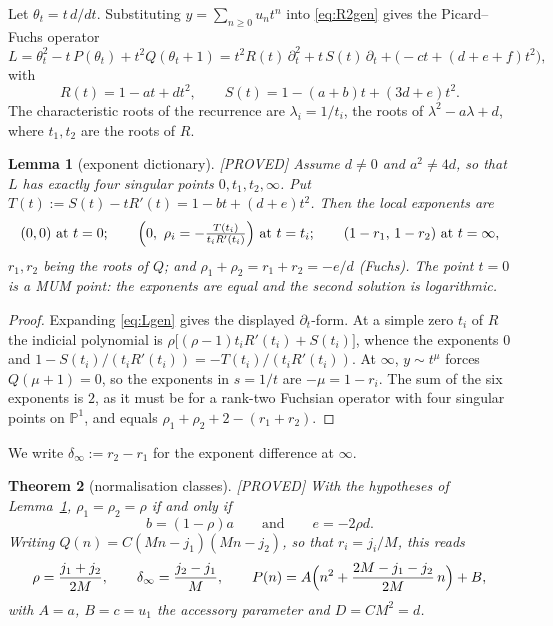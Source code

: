 \documentclass[11pt,reqno]{amsart}
\theoremstyle{plain}
\newtheorem{theorem}{Theorem}[section]
\newtheorem{lemma}[theorem]{Lemma}
\theoremstyle{definition}
\theoremstyle{remark}
\theoremstyle{plain}
\newcommand{\PP}{\mathbb{P}}
\newcommand{\tht}{\theta_t}
\newcommand{\Proved}{\textup{\textsf{[PROVED]}}}
\begin{document}
Let $\tht=t\,d/dt$. Substituting $y=\sum_{n\ge0}u_nt^n$ into \eqref{eq:R2gen}
gives the Picard--Fuchs operator
\begin{equation}\label{eq:Lgen}
L=\tht^2-t\,P(\tht)+t^2Q(\tht+1)
 =t^2R(t)\,\partial_t^2+t\,S(t)\,\partial_t+\bigl(-ct+(d{+}e{+}f)t^2\bigr),
\end{equation}
with
\[
R(t)=1-at+dt^2,\qquad S(t)=1-(a+b)t+(3d+e)t^2 .
\]
The characteristic roots of the recurrence are $\lambda_i=1/t_i$, the roots of
$\lambda^2-a\lambda+d$, where $t_1,t_2$ are the roots of $R$.

\begin{lemma}[exponent dictionary]\label{lem:exps}
\Proved{} Assume $d\neq0$ and $a^2\neq4d$, so that $L$ has exactly four singular
points $0,t_1,t_2,\infty$. Put $T(t):=S(t)-tR'(t)=1-bt+(d+e)t^2$. Then the local
exponents are
\[
(0,0)\ \text{at }t=0;\qquad
\Bigl(0,\ \rho_i=-\tfrac{T(t_i)}{t_iR'(t_i)}\Bigr)\ \text{at }t=t_i;\qquad
(1-r_1,\,1-r_2)\ \text{at }t=\infty,
\]
$r_1,r_2$ being the roots of $Q$; and $\rho_1+\rho_2=r_1+r_2=-e/d$
\textup{(}Fuchs\textup{)}. The point $t=0$ is a MUM point: the exponents are
equal and the second solution is logarithmic.
\end{lemma}

\begin{proof}
Expanding \eqref{eq:Lgen} gives the displayed $\partial_t$-form. At a simple zero
$t_i$ of $R$ the indicial polynomial is
$\rho\bigl[(\rho-1)t_iR'(t_i)+S(t_i)\bigr]$, whence the exponents $0$ and
$1-S(t_i)/(t_iR'(t_i))=-T(t_i)/(t_iR'(t_i))$. At $\infty$, $y\sim t^{\mu}$
forces $Q(\mu+1)=0$, so the exponents in $s=1/t$ are $-\mu=1-r_i$. The sum of the
six exponents is $2$, as it must be for a rank-two Fuchsian operator with four
singular points on $\PP^1$, and equals $\rho_1+\rho_2+2-(r_1+r_2)$.
\end{proof}

We write $\delta_\infty:=r_2-r_1$ for the exponent difference at $\infty$.

\begin{theorem}[normalisation classes]\label{thm:norm}
\Proved{} With the hypotheses of Lemma~\ref{lem:exps}, $\rho_1=\rho_2=\rho$ if
and only if
\begin{equation}\label{eq:normclass}
b=(1-\rho)a\qquad\text{and}\qquad e=-2\rho d .
\end{equation}
Writing $Q(n)=C(Mn-j_1)(Mn-j_2)$, so that $r_i=j_i/M$, this reads
\[
\rho=\frac{j_1+j_2}{2M},\qquad
\delta_\infty=\frac{j_2-j_1}{M},\qquad
P(n)=A\Bigl(n^2+\frac{2M-j_1-j_2}{2M}\,n\Bigr)+B ,
\]
with $A=a$, $B=c=u_1$ the accessory parameter and $D=CM^2=d$.
\end{theorem}
\end{document}
